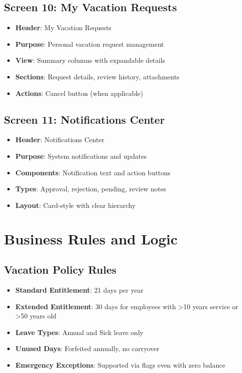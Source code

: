 \documentclass[12pt,a4paper]{article}
\begin{document}
\subsection{Screen 10: My Vacation Requests}
\begin{itemize}
    \item \textbf{Header}: My Vacation Requests
    \item \textbf{Purpose}: Personal vacation request management
    \item \textbf{View}: Summary columns with expandable details
    \item \textbf{Sections}: Request details, review history, attachments
    \item \textbf{Actions}: Cancel button (when applicable)
\end{itemize}

\subsection{Screen 11: Notifications Center}
\begin{itemize}
    \item \textbf{Header}: Notifications Center
    \item \textbf{Purpose}: System notifications and updates
    \item \textbf{Components}: Notification text and action buttons
    \item \textbf{Types}: Approval, rejection, pending, review notes
    \item \textbf{Layout}: Card-style with clear hierarchy
\end{itemize}

\section{Business Rules and Logic}

\subsection{Vacation Policy Rules}
\begin{itemize}
    \item \textbf{Standard Entitlement}: 21 days per year
    \item \textbf{Extended Entitlement}: 30 days for employees with >10 years service or >50 years old
    \item \textbf{Leave Types}: Annual and Sick leave only
    \item \textbf{Unused Days}: Forfeited annually, no carryover
    \item \textbf{Emergency Exceptions}: Supported via flags even with zero balance
\end{itemize}
\end{document}
